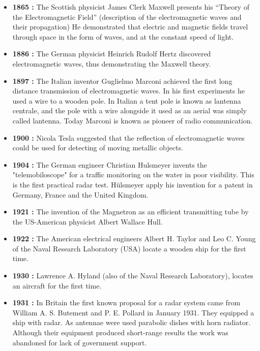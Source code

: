 \documentclass[14pt]{article} %
\begin{document}
\begin{itemize}
\item \textbf {1865  :} The Scottish physicist James Clerk Maxwell presents his “Theory of the Electromagnetic Field” (description of the electromagnetic waves and their propagation) He demonstrated that electric and magnetic fields travel through space in the form of waves, and at the constant speed of light.

\item \textbf {1886 : }The German physicist Heinrich Rudolf Hertz  discovered electromagnetic waves, thus demonstrating the Maxwell theory.

\item \textbf { 1897 :  }The Italian inventor Guglielmo Marconi achieved the first long distance transmission of electromagnetic waves. In his first experiments he used a wire to a wooden pole. In Italian a tent pole is known as lantenna centrale, and the pole with a wire alongside it used as an aerial was simply called lantenna. Today Marconi is known as pioneer of radio communication.

\item \textbf {1900 :  }Nicola Tesla suggested that the reflection of electromagnetic waves could be used for detecting of moving metallic objects.

\item \textbf {1904 :  }The German engineer Christian Hulsmeyer invents the "telemobiloscope" for a traffic monitoring on the water in poor visibility. This is the first practical radar test. Hülsmeyer apply his invention for a patent in Germany, France and the United Kingdom.

\item \textbf {1921 :  }The invention of the Magnetron as an efficient transmitting tube by the US-American physicist Albert Wallace Hull.

\item \textbf {1922 : }The American electrical engineers Albert H. Taylor and Leo C. Young of the Naval Research Laboratory (USA) locate a wooden ship for the first time.

\item \textbf {1930 :  }Lawrence A. Hyland (also of the Naval Research Laboratory), locates an aircraft for the first time.

\item \textbf {1931 : }In Britain the first known proposal for a radar system came from William A. S. Butement and P. E. Pollard in January 1931. They equipped a ship with radar. As antennae were used parabolic dishes with horn radiator. Although their equipment produced short-range results the work was abandoned for lack of government support.


\end{itemize}
\end{document}
